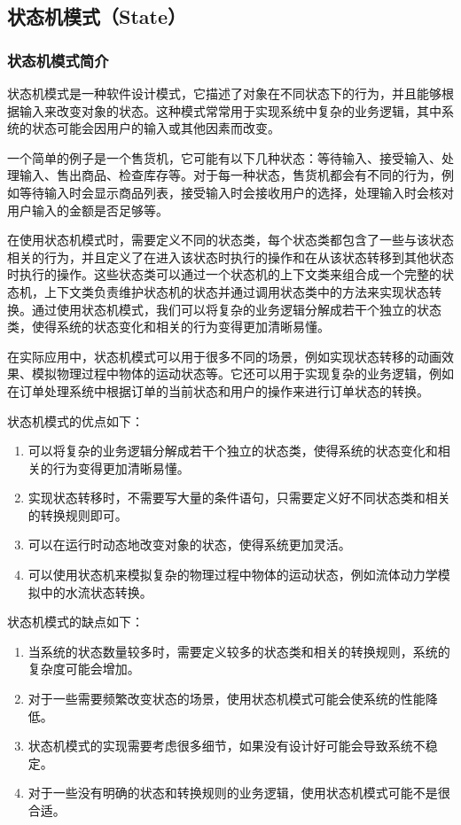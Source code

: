 \subsection{状态机模式（State）}

\subsubsection{状态机模式简介}


状态机模式是一种软件设计模式，它描述了对象在不同状态下的行为，并且能够根据输入来改变对象的状态。这种模式常常用于实现系统中复杂的业务逻辑，其中系统的状态可能会因用户的输入或其他因素而改变。

一个简单的例子是一个售货机，它可能有以下几种状态：等待输入、接受输入、处理输入、售出商品、检查库存等。对于每一种状态，售货机都会有不同的行为，例如等待输入时会显示商品列表，接受输入时会接收用户的选择，处理输入时会核对用户输入的金额是否足够等。

在使用状态机模式时，需要定义不同的状态类，每个状态类都包含了一些与该状态相关的行为，并且定义了在进入该状态时执行的操作和在从该状态转移到其他状态时执行的操作。这些状态类可以通过一个状态机的上下文类来组合成一个完整的状态机，上下文类负责维护状态机的状态并通过调用状态类中的方法来实现状态转换。通过使用状态机模式，我们可以将复杂的业务逻辑分解成若干个独立的状态类，使得系统的状态变化和相关的行为变得更加清晰易懂。

在实际应用中，状态机模式可以用于很多不同的场景，例如实现状态转移的动画效果、模拟物理过程中物体的运动状态等。它还可以用于实现复杂的业务逻辑，例如在订单处理系统中根据订单的当前状态和用户的操作来进行订单状态的转换。

状态机模式的优点如下：
\begin{enumerate}
\item 可以将复杂的业务逻辑分解成若干个独立的状态类，使得系统的状态变化和相关的行为变得更加清晰易懂。
\item 实现状态转移时，不需要写大量的条件语句，只需要定义好不同状态类和相关的转换规则即可。
\item 可以在运行时动态地改变对象的状态，使得系统更加灵活。
\item 可以使用状态机来模拟复杂的物理过程中物体的运动状态，例如流体动力学模拟中的水流状态转换。
\end{enumerate}

状态机模式的缺点如下：
\begin{enumerate}
\item 当系统的状态数量较多时，需要定义较多的状态类和相关的转换规则，系统的复杂度可能会增加。
\item 对于一些需要频繁改变状态的场景，使用状态机模式可能会使系统的性能降低。
\item 状态机模式的实现需要考虑很多细节，如果没有设计好可能会导致系统不稳定。
\item 对于一些没有明确的状态和转换规则的业务逻辑，使用状态机模式可能不是很合适。
\end{enumerate}



